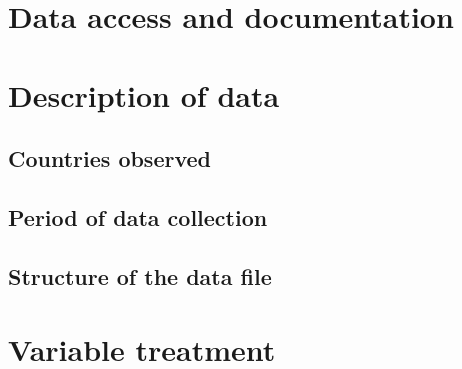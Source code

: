 \documentclass[preprint,12pt,authoryear]{elsarticle}
\begin{document}
\section{Data access and documentation}
\label{}

\section{Description of data}
\label{}
\subsection{Countries observed}
\subsection{Period of data collection}
\subsection{Structure of the data file}

\section{Variable treatment}
\label{}
\end{document}
